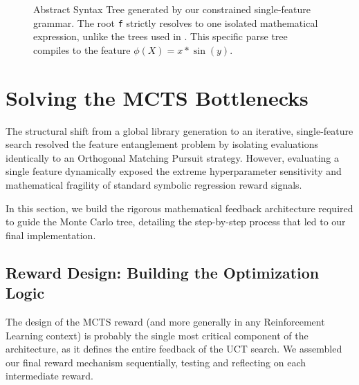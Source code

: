 \documentclass[11pt, a4paper]{article}
\begin{document}
\begin{figure}[H]
    \centering
    \caption{Abstract Syntax Tree generated by our constrained single-feature grammar. The root \texttt{f} strictly resolves to one isolated mathematical expression, unlike the trees used in \cite{sun2023spl}. This specific parse tree compiles to the feature $\phi(X) = x * \sin(y)$.}
    \label{fig:single_feature_ast}
\end{figure}

\section{Solving the MCTS Bottlenecks}

The structural shift from a global library generation to an iterative, single-feature search resolved the feature entanglement problem by isolating evaluations identically to an Orthogonal Matching Pursuit strategy. However, evaluating a single feature dynamically exposed the extreme hyperparameter sensitivity and mathematical fragility of standard symbolic regression reward signals. 

In this section, we build the rigorous mathematical feedback architecture required to guide the Monte Carlo tree, detailing the step-by-step process that led to our final implementation.

\subsection{Reward Design: Building the Optimization Logic}

The design of the MCTS reward (and more generally in any Reinforcement Learning context) is probably the single most critical component of the architecture, as it defines the entire feedback of the UCT search. We assembled our final reward mechanism sequentially, testing and reflecting on each intermediate reward.
\end{document}
